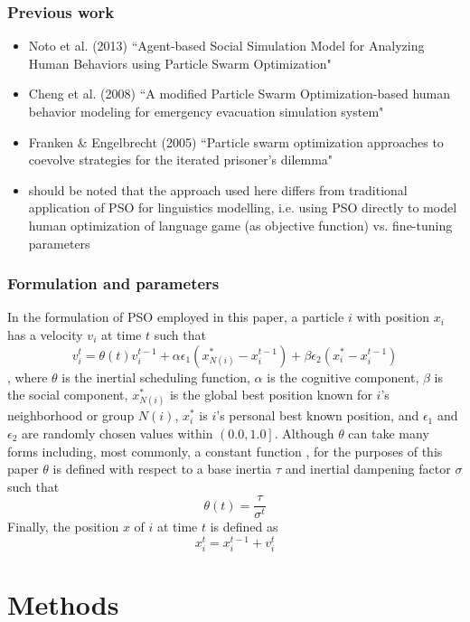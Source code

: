 \documentclass[12pt,a4paper]{article}
\begin{document}


\subsubsection{Previous work}
\begin{itemize}


\item Noto et al. (2013) ``Agent-based Social Simulation Model for Analyzing Human Behaviors using Particle Swarm Optimization"

\item Cheng et al. (2008) ``A modified Particle Swarm Optimization-based human behavior modeling for emergency evacuation simulation system"

\item Franken \& Engelbrecht (2005) ``Particle swarm optimization approaches to coevolve strategies for the iterated prisoner's dilemma"

\item should be noted that the approach used here differs from traditional application of PSO for linguistics modelling, i.e. using PSO directly to model human optimization of language game (as objective function) vs. fine-tuning parameters
\end{itemize}
\subsubsection{Formulation and parameters}
In the formulation of PSO employed in this paper, a particle $i$ with position $x_i$ has a velocity $v_i$ at time $t$ such that
\[
v_i^t = \theta(t) v_i^{t-1} + \alpha \epsilon_1 (x_{N(i)}^* - x_i^{t-1}) + \beta \epsilon_2 (x_i^* - x_i^{t-1})
\],
where $\theta$ is the inertial scheduling function, $\alpha$ is the cognitive component, $\beta$ is the social component, $x_{N(i)}^*$ is the global best position known for $i$'s neighborhood or group $N(i)$, $x_i^*$ is $i$'s personal best known position, and $\epsilon_1$ and $\epsilon_2$ are randomly chosen values within $\left(0.0, 1.0\right]$. Although $\theta$ can take many forms including, most commonly, a constant function \citep[p.~101]{yang2014}, for the purposes of this paper $\theta$ is defined with respect to a base inertia $\tau$ and inertial dampening factor $\sigma$ such that
\[
\theta(t) = \frac{\tau}{\sigma^t} 
\]
Finally, the position $x$ of $i$ at time $t$ is defined as
\[
x_i^t = x_i^{t-1} + v_i^t 
\]

\section{Methods}
\end{document}
